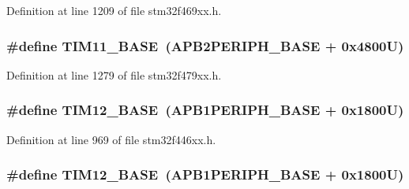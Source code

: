 Definition at line 1209 of file stm32f469xx.\+h.

\subsubsection[{\texorpdfstring{T\+I\+M11\+\_\+\+B\+A\+SE}{TIM11_BASE}}]{\setlength{\rightskip}{0pt plus 5cm}\#define T\+I\+M11\+\_\+\+B\+A\+SE~({\bf A\+P\+B2\+P\+E\+R\+I\+P\+H\+\_\+\+B\+A\+SE} + 0x4800\+U)}\hypertarget{group___peripheral__memory__map_ga3a4a06bb84c703084f0509e105ffaf1d}{}\label{group___peripheral__memory__map_ga3a4a06bb84c703084f0509e105ffaf1d}


Definition at line 1279 of file stm32f479xx.\+h.

\subsubsection[{\texorpdfstring{T\+I\+M12\+\_\+\+B\+A\+SE}{TIM12_BASE}}]{\setlength{\rightskip}{0pt plus 5cm}\#define T\+I\+M12\+\_\+\+B\+A\+SE~({\bf A\+P\+B1\+P\+E\+R\+I\+P\+H\+\_\+\+B\+A\+SE} + 0x1800\+U)}\hypertarget{group___peripheral__memory__map_ga33dea32fadbaecea161c2ef7927992fd}{}\label{group___peripheral__memory__map_ga33dea32fadbaecea161c2ef7927992fd}


Definition at line 969 of file stm32f446xx.\+h.

\subsubsection[{\texorpdfstring{T\+I\+M12\+\_\+\+B\+A\+SE}{TIM12_BASE}}]{\setlength{\rightskip}{0pt plus 5cm}\#define T\+I\+M12\+\_\+\+B\+A\+SE~({\bf A\+P\+B1\+P\+E\+R\+I\+P\+H\+\_\+\+B\+A\+SE} + 0x1800\+U)}\hypertarget{group___peripheral__memory__map_ga33dea32fadbaecea161c2ef7927992fd}{}\label{group___peripheral__memory__map_ga33dea32fadbaecea161c2ef7927992fd}


